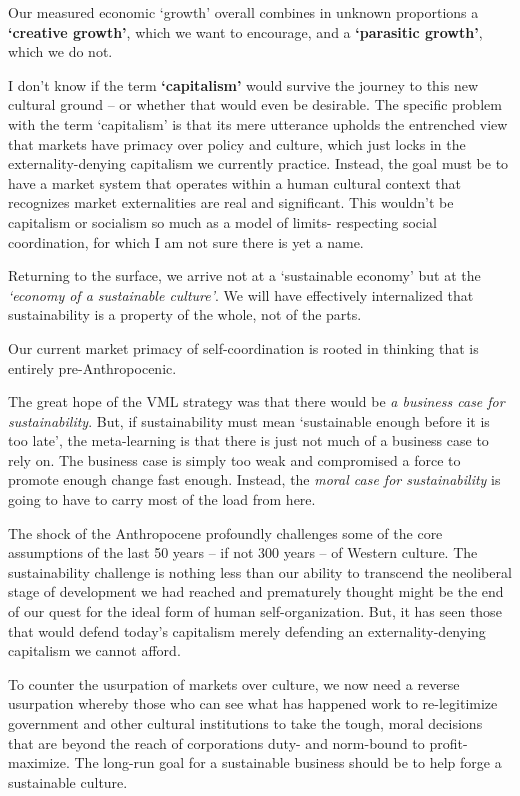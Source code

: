 \documentclass[
]{book}
\begin{document}
Our measured economic `growth' overall combines in unknown proportions a \textbf{`creative growth'}, which we want to encourage, and a \textbf{`parasitic growth'}, which we do not.

I don't know if the term \textbf{`capitalism'} would survive the journey to this new cultural ground -- or
whether that would even be desirable. The specific problem with the term `capitalism' is that its mere
utterance upholds the entrenched view that markets have primacy over policy and culture, which just
locks in the externality-denying capitalism we currently practice. Instead, the goal must be to have a
market system that operates within a human cultural context that recognizes market externalities
are real and significant. This wouldn't be capitalism or socialism so much as a model of limits-
respecting social coordination, for which I am not sure there is yet a name.

Returning to the surface, we arrive not at a `sustainable economy' but at the \emph{`economy of a
sustainable culture'}.
We will have effectively internalized that sustainability is a property of the whole, not of the parts.

Our current market primacy of self-coordination is rooted in
thinking that is entirely pre-Anthropocenic.

The great hope of the VML strategy was that there would be \emph{a business case for
sustainability}. But, if sustainability must mean `sustainable enough before it is too late', the
meta-learning is that there is just not much of a business case to rely on. The business case is
simply too weak and compromised a force to promote enough change fast enough. Instead,
the \emph{moral case for sustainability} is going to have to carry most of the load from here.

The shock of the Anthropocene profoundly challenges some of the core assumptions of the last 50
years -- if not 300 years -- of Western culture. The sustainability challenge is nothing less than our
ability to transcend the neoliberal stage of development we had reached and prematurely thought
might be the end of our quest for the ideal form of human self-organization. But, it has seen those
that would defend today's capitalism merely defending an externality-denying capitalism we cannot
afford.

To counter the usurpation of markets over culture, we now need a reverse usurpation
whereby those who can see what has happened work to re-legitimize government and other cultural
institutions to take the tough, moral decisions that are beyond the reach of corporations duty- and
norm-bound to profit-maximize.
The long-run goal for a sustainable business should be to help forge a sustainable culture.
\end{document}
